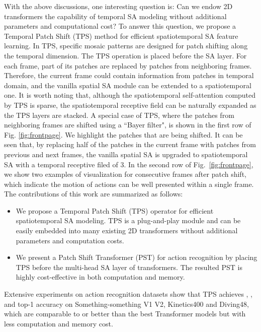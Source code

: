 \documentclass[runningheads]{llncs}
\begin{document}
	
	
	
	With the above discussions, one interesting question is: Can we endow 2D transformers the capability of temporal SA modeling without additional parameters and computational cost? To answer this question, we propose a Temporal Patch Shift (TPS) method for efficient spatiotemporal SA feature learning. In TPS, specific mosaic patterns are designed for patch shifting along the temporal dimension. The TPS operation is placed before the SA layer. For each frame, part of its patches are replaced by patches from neighboring frames. Therefore, the current frame could contain information from patches in temporal domain, and the vanilla spatial SA module can be extended to a spatiotemporal one. It is worth noting that, although the spatiotemporal self-attention computed by TPS is sparse, the spatiotemporal receptive field can be naturally expanded as the TPS layers are stacked. A special case of TPS, where the patches from neighboring frames are shifted using a ``Bayer filter", is shown in the first row of Fig. \ref{fig:frontpage}. We highlight the patches that are being shifted. It can be seen that, by replacing half of the patches in the current frame with patches from previous and next frames, the vanilla spatial SA is upgraded to spatiotemporal SA with a temporal receptive filed of 3. In the second row of Fig.~\ref{fig:frontpage}, we show two examples of visualization for consecutive frames after patch shift, which indicate the motion of actions can be well presented within a single frame. The contributions of this work are summarized as follows:
	\begin{itemize}
		\item We propose a Temporal Patch Shift (TPS) operator for efficient spatiotemporal SA modeling. TPS is a plug-and-play module and can be easily embedded into many existing 2D transformers without additional parameters and computation costs. 
		\item We present a Patch Shift Transformer (PST) for action recognition by placing TPS before the multi-head SA layer of transformers. The resulted PST is highly cost-effective in both computation and memory.
		
	\end{itemize}
	
	
	Extensive experiments on action recognition datasets show that TPS achieves , ,  and  top-1 accuracy on Something-something V1  V2, Kinetics400 and Diving48, which are comparable to or better than the best Transformer models but with less computation and memory cost.
	
\end{document}
